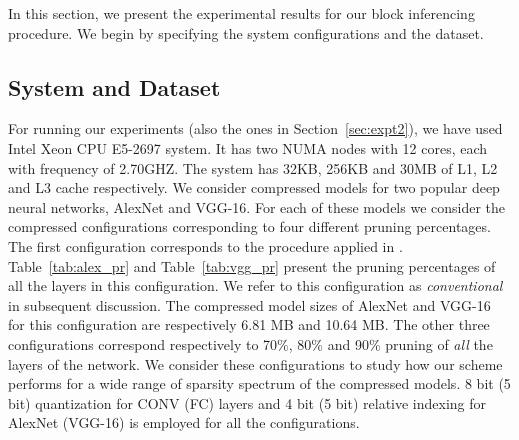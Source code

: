 In this section, we present the experimental results for our block inferencing procedure. We begin by specifying the system configurations and the dataset.

\subsection{System and Dataset}

For running our experiments (also the ones in Section~\ref{sec:expt2}), we have used Intel Xeon CPU E5-2697 system. It has two NUMA nodes 
with 12 cores, each with frequency of 2.70GHZ. The system has 32KB, 256KB and 30MB of L1, L2 and L3 cache respectively.
We consider compressed models for two popular deep neural networks, AlexNet and VGG-16. 
For each of these models we consider the compressed configurations corresponding to four different pruning percentages.
The first configuration corresponds to the procedure applied in  \cite{HanMD15}.  
Table~\ref{tab:alex_pr} and Table~\ref{tab:vgg_pr}
 present the pruning percentages of all the layers in this configuration. We refer to this configuration as 
{\em conventional} in subsequent discussion.
The compressed model sizes of AlexNet and VGG-16 for this configuration are respectively 6.81 MB and 10.64 MB.
The other three configurations correspond respectively to 70\%, 80\% and 90\% pruning of {\em all} the layers of the network.  
We consider these configurations to study how our scheme performs for a wide range of sparsity spectrum of the compressed models.
8 bit (5 bit) quantization for CONV (FC) layers
and 4 bit (5 bit) relative indexing for AlexNet (VGG-16) is employed for all the configurations.

